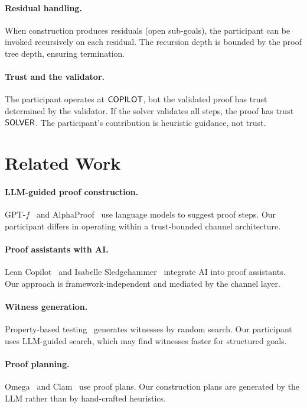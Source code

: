\documentclass[11pt]{article}
\begin{document}
\paragraph{Residual handling.}
When construction produces residuals (open sub-goals), the
participant can be invoked recursively on each residual.
The recursion depth is bounded by the proof tree depth,
ensuring termination.

\paragraph{Trust and the validator.}
The participant operates at $\mathsf{COPILOT}$, but the validated
proof has trust determined by the validator.  If the solver
validates all steps, the proof has trust $\mathsf{SOLVER}$.  The
participant's contribution is heuristic guidance, not trust.

\section{Related Work}\label{sec:related}

\paragraph{LLM-guided proof construction.}
GPT-$f$~\cite{polu2020gptf} and AlphaProof~\cite{lample2022hypertree}
use language models to suggest proof steps.  Our participant
differs in operating within a trust-bounded channel architecture.

\paragraph{Proof assistants with AI.}
Lean Copilot~\cite{yang2019learning} and Isabelle
Sledgehammer~\cite{wenzel2014isabelle} integrate AI into
proof assistants.  Our approach is framework-independent and
mediated by the channel layer.

\paragraph{Witness generation.}
Property-based testing~\cite{claessen2000quickcheck} generates
witnesses by random search.  Our participant uses LLM-guided
search, which may find witnesses faster for structured goals.

\paragraph{Proof planning.}
Omega~\cite{basin1993rippling} and Clam~\cite{bundy1990clam}
use proof plans.  Our construction plans are generated by the
LLM rather than by hand-crafted heuristics.
\end{document}
